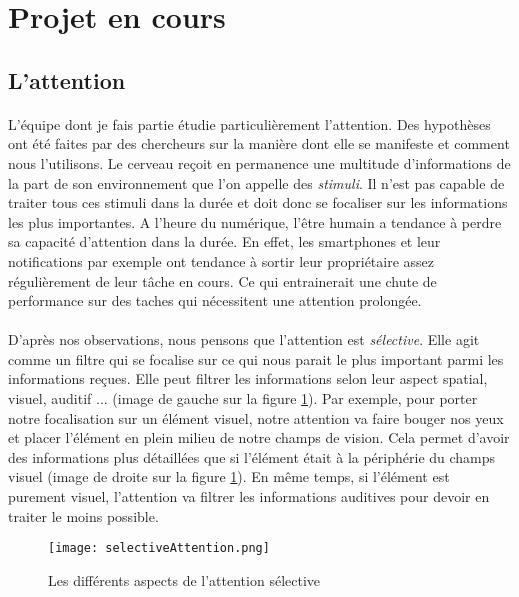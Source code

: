\section{Projet en cours}

\subsection{L'attention}

\paragraph{}L'équipe dont je fais partie étudie particulièrement l'attention. Des hypothèses ont été faites par des chercheurs sur la manière dont elle se manifeste et comment nous
l'utilisons. Le cerveau reçoit en permanence une multitude d'informations de la part de son environnement que l'on appelle des \emph{stimuli}. Il n'est pas capable de traiter tous ces
stimuli dans la durée et doit donc se focaliser sur les informations les plus importantes. A l'heure du numérique, l'être humain a tendance à perdre sa capacité d'attention dans la
durée. En effet, les smartphones et leur notifications par exemple ont tendance à sortir leur propriétaire assez régulièrement de leur tâche en cours. Ce qui entrainerait une chute de
performance sur des taches qui nécessitent une attention prolongée.

\paragraph{}D'après nos observations, nous pensons que l'attention est \emph{sélective}. Elle agit comme un filtre qui se focalise sur ce qui nous parait le plus important parmi les
informations reçues. Elle peut filtrer les informations selon leur aspect spatial, visuel, auditif ... (image de gauche sur la figure \ref{AspectSelectiveAttention}). Par exemple, pour
porter notre focalisation sur un élément visuel, notre attention va faire bouger nos yeux et placer l'élément en plein milieu de notre champs de vision. Cela permet d'avoir des
informations plus détaillées que si l'élément était à la périphérie du champs visuel (image de droite sur la figure \ref{AspectSelectiveAttention}). En même temps, si l'élément est
purement visuel, l'attention va filtrer les informations auditives pour devoir en traiter le moins possible.

\begin{figure}[h]
    \begin{center}
    \texttt{[image: selectiveAttention.png]}
    \end{center}
    \caption{Les différents aspects de l'attention sélective}
\label{AspectSelectiveAttention}
\end{figure}

